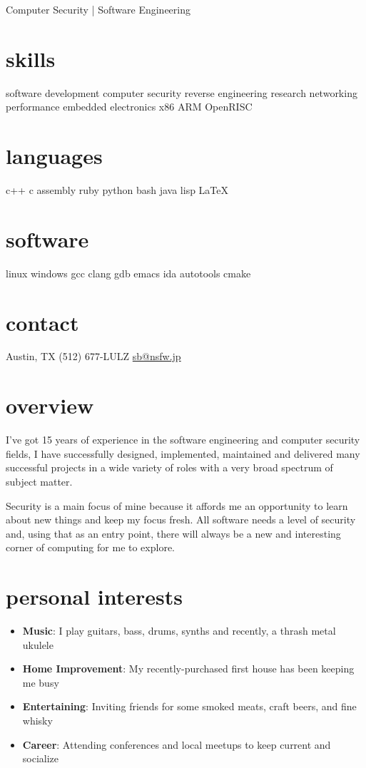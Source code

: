 \documentclass[]{friggeri-cv}
\begin{document}
       {Computer Security | Software Engineering}

\begin{aside}
  \section{skills}
  software development
  computer security
  reverse engineering
  research
  networking
  performance
  embedded
  electronics
  x86
  ARM
  OpenRISC
  \section{languages}
  c++
  c
  assembly
  ruby
  python
  bash
  java
  lisp
  \LaTeX
  \section{software}
  linux
  windows
  gcc
  clang
  gdb
  emacs
  ida
  autotools
  cmake
  \section{contact}
  Austin, TX
  (512) 677-LULZ
  \href{mailto:sb@nsfw.jp}{sb@nsfw.jp}
\end{aside}

\section{overview}

I've got 15 years of experience in the software engineering and
computer security fields, I have successfully designed, implemented,
maintained and delivered many successful projects in a wide variety of
roles with a very broad spectrum of subject matter.

Security is a main focus of mine because it affords me an opportunity
to learn about new things and keep my focus fresh. All software needs
a level of security and, using that as an entry point, there will
always be a new and interesting corner of computing for me to explore.

\section{personal interests}

\begin{itemize}
\item{\textbf{Music}: I play guitars, bass, drums, synths and recently, a thrash metal ukulele}
\item{\textbf{Home Improvement}: My recently-purchased first house has been keeping me busy}
\item{\textbf{Entertaining}: Inviting friends for some smoked meats, craft
  beers, and fine whisky}
\item{\textbf{Career}: Attending conferences and local meetups to keep current
  and socialize}
\end{itemize}
\end{document}
